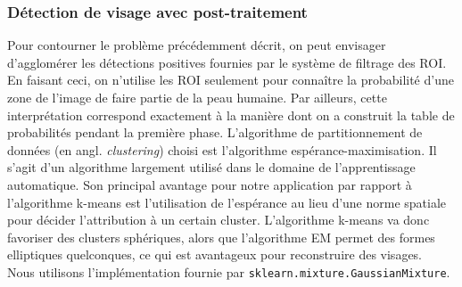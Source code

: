 \documentclass[a4paper,11pt]{article}
\begin{document}
\subsubsection{Détection de visage avec post-traitement}
Pour contourner le problème précédemment décrit, on peut envisager d'agglomérer les détections positives fournies par le système de filtrage des ROI.
En faisant ceci, on n'utilise les ROI seulement pour connaître la probabilité d'une zone de l'image de faire partie de la peau humaine.
Par ailleurs, cette interprétation correspond exactement à la manière dont on a construit la table de probabilités pendant la première phase.
\newline
\newline
L'algorithme de partitionnement de données (en angl. {\textit{clustering}}) choisi est l'algorithme espérance-maximisation.
Il s'agit d'un algorithme largement utilisé dans le domaine de l'apprentissage automatique. 
Son principal avantage pour notre application par rapport à l'algorithme k-means est l'utilisation de l'espérance au lieu d'une norme spatiale pour décider l'attribution à un certain cluster.
L'algorithme k-means va donc favoriser des clusters sphériques, alors que l'algorithme EM permet des formes elliptiques quelconques, ce qui est avantageux pour reconstruire des visages.\\
Nous utilisons l'implémentation fournie par \verb!sklearn.mixture.GaussianMixture!.
\newline
\end{document}
